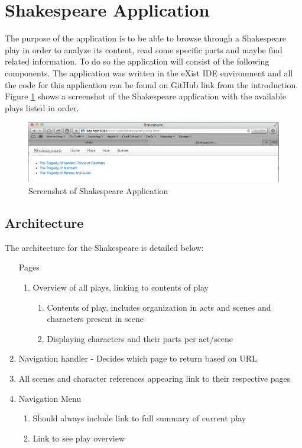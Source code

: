 \documentclass[Shakespeare.tex]{subfiles}
\begin{document}
\section{Shakespeare Application}

The purpose of the application is to be able to browse through a Shakespeare play in order to analyze its content, read some specific parts and maybe find related information. To do so the application will consist of the following components. The application was written in the eXist IDE environment and all the code for this application can be found on GitHub link from the introduction. Figure \ref{fig:shakespearemain} shows a screenshot of the Shakespeare application with the available plays listed in order.

\begin{figure} [H]
	\centering
	\includegraphics[width=1\textwidth]{./Figures/ShakespeareMain.png}
	\caption{Screenshot of Shakespeare Application}
	\label{fig:shakespearemain}
\end{figure}

\subsection{Architecture}
The architecture for the Shakespeare is detailed below:

\begin{enumerate}
	\item[Pages]
	\begin{enumerate}
		\item Overview of all plays, linking to contents of play
		\begin{enumerate}
			\item Contents of play, includes organization in acts and scenes and characters present in scene
			\item Displaying characters and their parts per act/scene
		\end{enumerate}
	\end{enumerate}
	\item Navigation handler - Decides which page to return based on URL
	\item All scenes and character references appearing link to their respective pages
	\item Navigation Menu
		\begin{enumerate}
			\item Should always include link to full summary of current play
			\item Link to see play overview
		\end{enumerate}
\end{enumerate}
\end{document}
